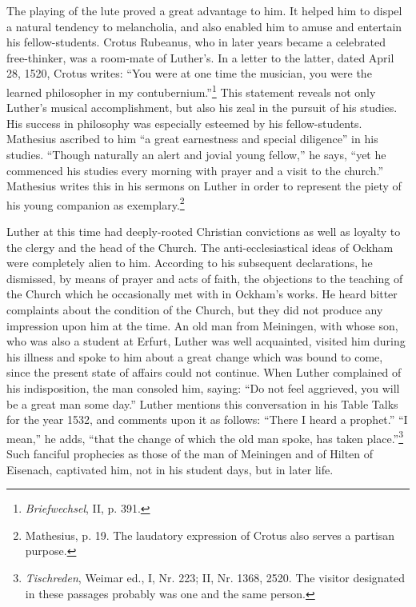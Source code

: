 The playing of the lute proved a great advantage to him. It helped
him to dispel a natural tendency to melancholia, and also enabled
him to amuse and entertain his fellow-students. Crotus Rubeanus,
who in later years became a celebrated free-thinker, was a room-mate
of Luther’s. In a letter to the latter, dated April 28, 1520, Crotus
writes: “You were at one time the musician, you were the learned
philosopher in my contubernium.”\footnote{\textit{Briefwechsel}, II, p. 391.}
This statement reveals not only
Luther’s musical accomplishment, but also his zeal in the pursuit
of his studies. His success in philosophy was especially esteemed by
his fellow-students. Mathesius ascribed to him “a great earnestness
and special diligence” in his studies. “Though naturally an alert and
jovial young fellow,” he says, “yet he commenced his studies every
morning with prayer and a visit to the church.” Mathesius writes
this in his sermons on Luther in order to represent the piety of his
young companion as exemplary.\footnote{Mathesius, p. 19. The laudatory expression of Crotus also serves a partisan purpose.}

Luther at this time had deeply-rooted Christian convictions as
well as loyalty to the clergy and the head of the Church. The anti-ecclesiastical
ideas of Ockham were completely alien to him. According
to his subsequent declarations, he dismissed, by means of
prayer and acts of faith, the objections to the teaching of the Church
which he occasionally met with in Ockham’s works. He heard bitter
complaints about the condition of the Church, but they did not
produce any impression upon him at the time. An old man from
Meiningen, with whose son, who was also a student at Erfurt, Luther
was well acquainted, visited him during his illness and spoke to him
about a great change which was bound to come, since the present
state of affairs could not continue. When Luther complained of his
indisposition, the man consoled him, saying: “Do not feel aggrieved,
you will be a great man some day.” Luther mentions this conversation
in his Table Talks for the year 1532, and comments upon it as follows: “There I heard a prophet.” “I mean,” he adds, “that
the change of which the old man spoke, has taken place.”\footnote{
    \textit{Tischreden}, Weimar ed., I, Nr. 223; II, Nr. 1368, 2520.
    The visitor designated in these passages probably was one and the same person.}
Such fanciful prophecies as those of the man of Meiningen and of Hilten
of Eisenach, captivated him, not in his student days, but in later life.

